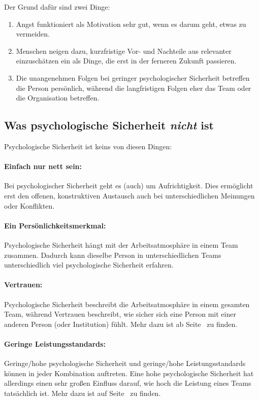 Der Grund dafür sind zwei Dinge:

\begin{enumerate}
  \item Angst funktioniert als Motivation sehr gut, wenn es darum geht, etwas zu vermeiden.
  \item Menschen neigen dazu, kurzfristige Vor- und Nachteile aus relevanter einzuschätzen ein als Dinge, die erst in der ferneren Zukunft passieren.
  \item Die unangenehmen Folgen bei geringer psychologischer Sicherheit betreffen die Person persönlich, während die langfristigen Folgen eher das Team oder die Organisation betreffen.
\end{enumerate}


\subsection{Was psychologische Sicherheit \emph{nicht} ist}

Psychologische Sicherheit ist keins von diesen Dingen:

\paragraph{Einfach nur nett sein:} Bei psychologischer Sicherheit geht es (auch) um Aufrichtigkeit. Dies ermöglicht erst den offenen, konstruktiven Austausch auch bei unterschiedlichen Meinungen oder Konflikten.

\paragraph{Ein Persönlichkeitsmerkmal:} Psychologische Sicherheit hängt mit der Arbeitsatmosphäre in einem Team zusammen. Dadurch kann dieselbe Person in unterschiedlichen Teams unterschiedlich viel psychologische Sicherheit erfahren.

\paragraph{Vertrauen:} Psychologische Sicherheit beschreibt die Arbeitsatmosphäre in einem gesamten Team, während Vertrauen beschreibt, wie sicher sich eine Person mit einer anderen Person (oder Institution) fühlt. Mehr dazu ist ab Seite~\pageref{vertrauen-vs-ps} zu finden.

\paragraph{Geringe Leistungsstandards:} Geringe/hohe psychologische Sicherheit und geringe/hohe Leistungsstandards können in jeder Kombination auftreten. Eine hohe psychologische Sicherheit hat allerdings einen sehr großen Einfluss darauf, wie hoch die Leistung eines Teams tatsächlich ist. Mehr dazu ist auf Seite~\pageref{ps-leistung} zu finden.



